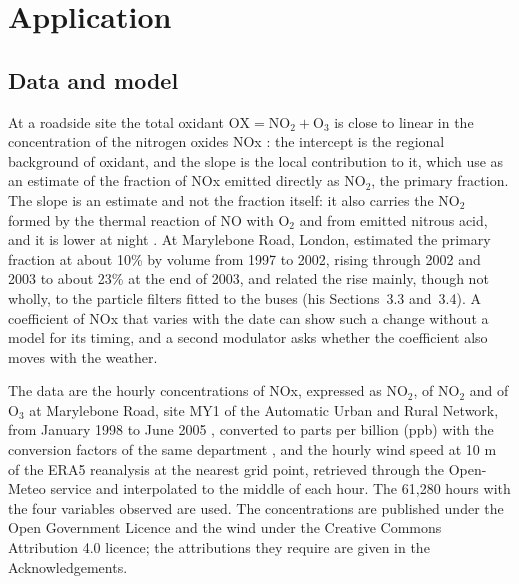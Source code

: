 \section{Application}
\label{sec:application}

\subsection{Data and model}
\label{sec:app-data}

At a roadside site the total oxidant $\mathrm{OX} = \mathrm{NO_2} +
\mathrm{O_3}$ is close to linear in the concentration of the nitrogen oxides
NOx \citep[Section~2.3]{Clapp-Jenkin-2001}: the intercept is the regional
background of oxidant, and the slope is the local contribution to it, which
\citet[Section~2.4]{Carslaw-Beevers-2005} use as an estimate of the fraction
of NOx emitted directly as $\mathrm{NO_2}$, the primary fraction. The slope
is an estimate and not the fraction itself: it also carries the
$\mathrm{NO_2}$ formed by the thermal reaction of NO with $\mathrm{O_2}$ and
from emitted nitrous acid, and it is lower at night
\citep[Section~2.3]{Clapp-Jenkin-2001}. At Marylebone Road, London,
\citet[Sections~3.1 and 3.2, Figure~3(a)]{Carslaw-2005} estimated the primary
fraction at about 10\% by volume from 1997 to 2002, rising through 2002 and
2003 to about 23\% at the end of 2003, and related the rise mainly, though not
wholly, to the particle filters fitted to the buses (his Sections~3.3
and~3.4). A coefficient of NOx that varies with the date can show such a
change without a model for its timing, and a second modulator asks whether
the coefficient also moves with the weather.

The data are the hourly concentrations of NOx, expressed as $\mathrm{NO_2}$,
of $\mathrm{NO_2}$ and of $\mathrm{O_3}$ at Marylebone Road, site MY1 of the
Automatic Urban and Rural Network, from January 1998 to June 2005
\citep{Defra-UKAIR-2026}, converted to parts per billion (ppb) with the
conversion factors of the same department \citep{Defra-2005}, and the hourly wind speed at 10 m of the ERA5
reanalysis \citep{Hersbach-2020,Hersbach-ERA5-2023} at the nearest grid point,
retrieved through the Open-Meteo service \citep{Zippenfenig-OpenMeteo-2024}
and interpolated to the middle of each hour. The 61,280 hours with the four
variables observed are used. The concentrations are published under the Open
Government Licence and the wind under the Creative Commons Attribution 4.0
licence; the attributions they require are given in the Acknowledgements.

